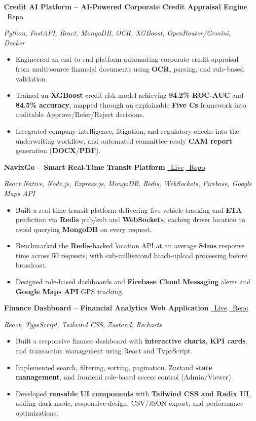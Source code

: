 \documentclass[10pt,a4paper]{article}
\newcommand{\resumeProject}[4]{
\noindent
\textbf{\large #1}
\hfill
{\footnotesize
\href{#3}{\textcolor{black}{\faExternalLinkAlt\ Live}}
\hspace{0.8em}
\href{#4}{\textcolor{black}{\faGithub\ Repo}}
}

\vspace{2pt}

{\small\itshape #2}

\vspace{2pt}
}
\newcommand{\resumeProjectRepo}[3]{
\noindent
\textbf{\large #1}
\hfill
{\footnotesize
\href{#3}{\textcolor{black}{\faGithub\ Repo}}
}

\vspace{2pt}

{\small\itshape #2}

\vspace{2pt}
}
\begin{document}
\resumeProjectRepo
{Credit AI Platform -- AI-Powered Corporate Credit Appraisal Engine}
{Python, FastAPI, React, MongoDB, OCR, XGBoost, OpenRouter/Gemini, Docker}
{https://github.com/Nandha050/credit-ai}
\begin{itemize}
\item Engineered an end-to-end platform automating corporate credit appraisal from multi-source financial documents using \textbf{OCR}, parsing, and rule-based validation.
\item Trained an \textbf{XGBoost} credit-risk model achieving \textbf{94.2\% ROC-AUC} and \textbf{84.5\% accuracy}, mapped through an explainable \textbf{Five Cs} framework into auditable Approve/Refer/Reject decisions.
\item Integrated company intelligence, litigation, and regulatory checks into the underwriting workflow, and automated committee-ready \textbf{CAM report} generation (\textbf{DOCX}/\textbf{PDF}).
\end{itemize}
\vspace{5pt}
\resumeProject
{NavixGo -- Smart Real-Time Transit Platform}
{React Native, Node.js, Express.js, MongoDB, Redis, WebSockets, Firebase, Google Maps API}
{https://www.navixgo.in/}
{https://github.com/Nandha050/navixgo}
\begin{itemize}
\item Built a real-time transit platform delivering live vehicle tracking and \textbf{ETA} prediction via \textbf{Redis} pub/sub and \textbf{WebSockets}, caching driver location to avoid querying \textbf{MongoDB} on every request.
\item Benchmarked the \textbf{Redis}-backed location API at an average \textbf{84ms} response time across 50 requests, with sub-millisecond batch-upload processing before broadcast.
\item Designed role-based dashboards and \textbf{Firebase Cloud Messaging} alerts and \textbf{Google Maps API} GPS tracking.
\end{itemize}
\vspace{5pt}
\resumeProject
{Finance Dashboard – Financial Analytics Web Application}
{React, TypeScript, Tailwind CSS, Zustand, Recharts}
{https://finance-interface-gray.vercel.app/}
{https://github.com/Nandha050/finance-interface}
\begin{itemize}
\item Built a responsive finance dashboard with \textbf{interactive charts, KPI cards}, and transaction management using React and TypeScript.
\item Implemented search, filtering, sorting, pagination, Zustand \textbf{state management}, and frontend role-based access control (Admin/Viewer).
\item Developed \textbf{reusable UI components} with \textbf{Tailwind CSS and Radix UI}, adding dark mode, responsive design, CSV/JSON export, and performance optimizations.
\end{itemize}
\end{document}
